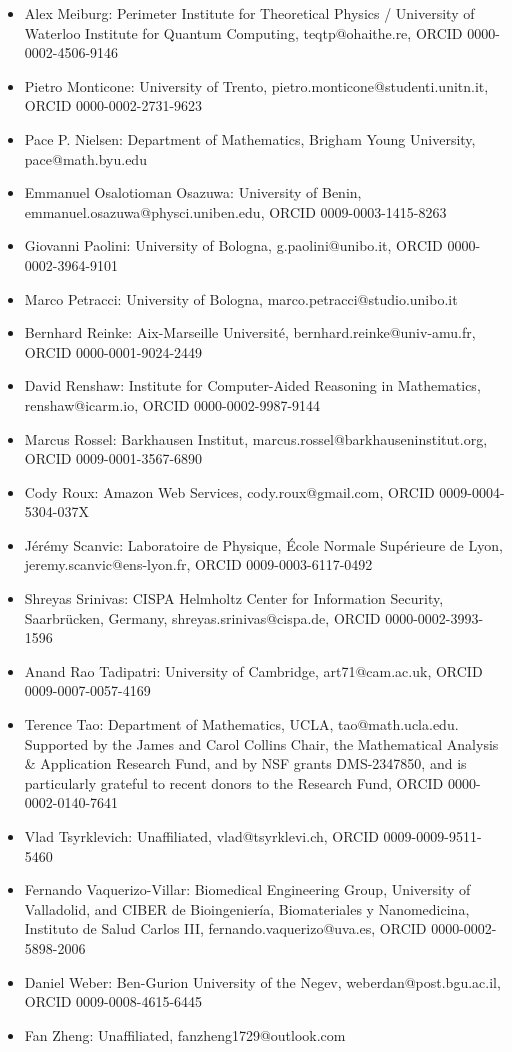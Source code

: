 \documentclass[12pt]{amsart}
\theoremstyle{definition}
\begin{document}
\begin{itemize}
    \item Alex Meiburg: Perimeter Institute for Theoretical Physics / University of Waterloo Institute for Quantum Computing, teqtp@ohaithe.re, ORCID 0000-0002-4506-9146
    \item Pietro Monticone: University of Trento, pietro.monticone@studenti.unitn.it, ORCID 0000-0002-2731-9623
    \item Pace P. Nielsen: Department of Mathematics, Brigham Young University, pace@math.byu.edu
    \item Emmanuel Osalotioman Osazuwa: University of Benin, emmanuel.osazuwa@physci.uniben.edu, ORCID 0009-0003-1415-8263
    \item Giovanni Paolini: University of Bologna, g.paolini@unibo.it, ORCID 0000-0002-3964-9101
    \item Marco Petracci: University of Bologna, marco.petracci@studio.unibo.it
    \item Bernhard Reinke: Aix-Marseille Université, bernhard.reinke@univ-amu.fr, ORCID 0000-0001-9024-2449
    \item David Renshaw: Institute for Computer-Aided Reasoning in Mathematics, renshaw@icarm.io, ORCID 0000-0002-9987-9144
    \item Marcus Rossel: Barkhausen Institut, marcus.rossel@barkhauseninstitut.org, ORCID 0009-0001-3567-6890
    \item Cody Roux: Amazon Web Services, cody.roux@gmail.com, ORCID 0009-0004-5304-037X
    \item J\'er\'emy Scanvic: Laboratoire de Physique, École Normale Supérieure de Lyon, jeremy.scanvic@ens-lyon.fr, ORCID 0009-0003-6117-0492
    \item Shreyas Srinivas: CISPA Helmholtz Center for Information Security, Saarbr\"{u}cken, Germany, shreyas.srinivas@cispa.de, ORCID 0000-0002-3993-1596
    \item Anand Rao Tadipatri: University of Cambridge, art71@cam.ac.uk, ORCID 0009-0007-0057-4169
    \item Terence Tao: Department of Mathematics, UCLA, tao@math.ucla.edu. Supported by the James and Carol Collins Chair, the Mathematical Analysis \& Application Research Fund, and by NSF grants DMS-2347850, and is particularly grateful to recent donors to the Research Fund, ORCID 0000-0002-0140-7641
    \item Vlad Tsyrklevich: Unaffiliated, vlad@tsyrklevi.ch, ORCID 0009-0009-9511-5460
    \item Fernando Vaquerizo-Villar: Biomedical Engineering Group, University of Valladolid, and CIBER de Bioingeniería, Biomateriales y Nanomedicina, Instituto de Salud Carlos III, fernando.vaquerizo@uva.es, ORCID 0000-0002-5898-2006
    \item Daniel Weber: Ben-Gurion University of the Negev, weberdan@post.bgu.ac.il, ORCID 0009-0008-4615-6445
    \item Fan Zheng: Unaffiliated, fanzheng1729@outlook.com
\end{itemize}




\end{document}

